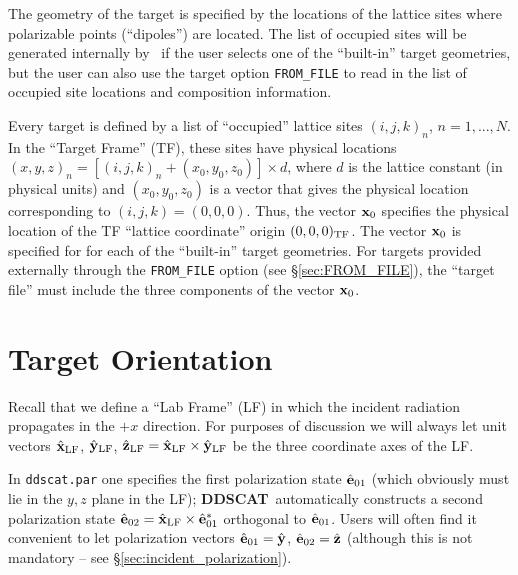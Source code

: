 The geometry of the target is specified by the locations of the
lattice sites where polarizable points (``dipoles'') are located.
The list of occupied sites will be generated internally by \ddscat\ if
the user selects one of the ``built-in'' target geometries, but the
user can also use the target option {\tt FROM\_FILE} to read in the
list of occupied site locations and composition information.

Every target is defined by a list of ``occupied'' lattice sites
$(i,j,k)_n$, $n=1,...,N$.
In the ``Target Frame'' (TF), these sites have physical locations
$(x,y,z)_n = [(i,j,k)_n + (x_0,y_0,z_0)]\times d$,
where $d$ is the lattice constant (in physical units)
and $(x_0,y_0,z_0)$ is a vector that gives the physical
location corresponding to $(i,j,k)=(0,0,0)$.
Thus, the vector ${\bf x}_0$ specifies the physical location of the TF 
``lattice coordinate'' origin 
$(0,0,0)_{\rm TF}$.
The vector ${\bf x}_0$ 
is specified for 
for each of the ``built-in'' target geometries.
For targets provided externally through the {\tt FROM\_FILE}
option (see \S\ref{sec:FROM_FILE}), the ``target file'' must
include the three components of the vector ${\bf x}_0$.

\section{Target Orientation \label{sec:target_orientation}}

Recall that we define a ``Lab Frame'' (LF) in which the incident
radiation propagates in the $+x$ direction.  
For purposes of discussion we will always
let unit vectors $\hat{\bf x}_{\rm LF}$, $\hat{\bf y}_{\rm LF}$, $\hat{\bf z}_{\rm LF}=\hat{\bf x}_{\rm LF}\times\hat{\bf y}_{\rm LF}$ 
be the three coordinate axes of the LF.
 
In {\tt ddscat.par} one
specifies the first polarization state ${\hat{\bf e}}_{01}$ (which
obviously must lie in the $y,z$ plane in the LF); {{\bf DDSCAT}}\
automatically constructs a second polarization state ${\hat{\bf
e}}_{02} = \hat{\bf x}_{\rm LF} \times {\hat{\bf e}}_{01}^*$ orthogonal to
${\hat{\bf e}}_{01}$.
Users will often find it convenient to let polarization
vectors ${\hat{\bf e}}_{01}={\hat{\bf y}}$, ${\hat{\bf
e}}_{02}={\hat{\bf z}}$ (although this is not mandatory -- see
\S\ref{sec:incident_polarization}).

